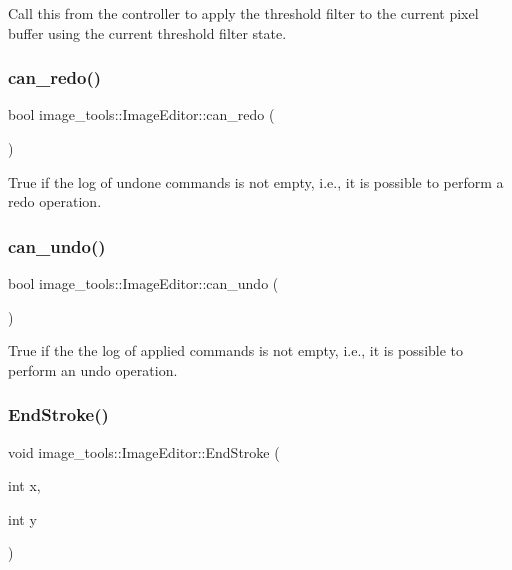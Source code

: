 Call this from the controller to apply the threshold filter to the current pixel buffer using the current threshold filter state. \mbox{\label{classimage__tools_1_1ImageEditor_a10d85c58555947ec7644e6f6184ee041}} 
\subsubsection{\texorpdfstring{can\+\_\+redo()}{can\_redo()}}
{\footnotesize\ttfamily bool image\+\_\+tools\+::\+Image\+Editor\+::can\+\_\+redo (\begin{DoxyParamCaption}{ }\end{DoxyParamCaption})}

True if the log of undone commands is not empty, i.\+e., it is possible to perform a redo operation. \mbox{\label{classimage__tools_1_1ImageEditor_aeed8d58a2f7b08507b8c14a07b1774a8}} 
\subsubsection{\texorpdfstring{can\+\_\+undo()}{can\_undo()}}
{\footnotesize\ttfamily bool image\+\_\+tools\+::\+Image\+Editor\+::can\+\_\+undo (\begin{DoxyParamCaption}{ }\end{DoxyParamCaption})}

True if the the log of applied commands is not empty, i.\+e., it is possible to perform an undo operation. \mbox{\label{classimage__tools_1_1ImageEditor_a14b562aac1107fec7f28a53fe44f2550}} 
\subsubsection{\texorpdfstring{End\+Stroke()}{EndStroke()}}
{\footnotesize\ttfamily void image\+\_\+tools\+::\+Image\+Editor\+::\+End\+Stroke (\begin{DoxyParamCaption}\item[{int}]{x,  }\item[{int}]{y }\end{DoxyParamCaption})}

